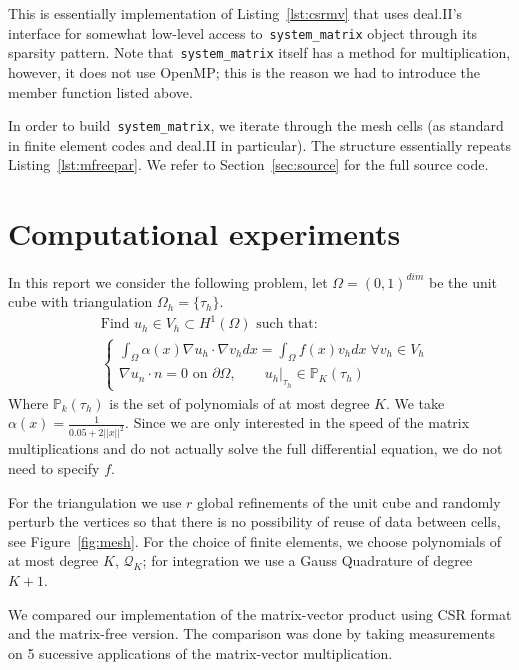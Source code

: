 \documentclass[12pt]{article}
\begin{document}
This is essentially implementation of Listing~\ref{lst:csrmv} that uses deal.II's interface for somewhat low-level access to~\texttt{system\_matrix} object through its sparsity pattern. Note that~\texttt{system\_matrix} itself has a method for multiplication, however, it does not use OpenMP; this is the reason we had to introduce the member function listed above.

In order to build~\texttt{system\_matrix}, we iterate through the mesh cells (as standard in finite element codes and deal.II in particular). The structure essentially repeats Listing~\ref{lst:mfreepar}. We refer to Section~\ref{sec:source} for the full source code. 

\section{Computational experiments}
In this report we consider the following problem, let $\Omega = (0, 1)^{dim}$ be the unit cube with triangulation $\Omega_h = \{\tau_{h}\}$.
\begin{align*}
&\text{Find } u_{h} \in V_h \subset H^{1}(\Omega) \text{ such that: }  \\
&\begin{cases}
\int_{\Omega} \alpha(x) \nabla u_{h} \cdot \nabla v_{h} dx  = \int_{\Omega} f(x) v_{h} dx \; \forall v_{h} \in V_h \\
\nabla u_{n} \cdot n = 0 \text{ on } \partial \Omega ,\qquad u_{h} \vert_{\tau_h} \in \mathbb{P}_{K}(\tau_h) 
\end{cases}
\end{align*}
Where $\mathbb{P}_{k}(\tau_h)$ is the set of polynomials of at most degree $K$. We take $\alpha(x) = \frac{1}{0.05 + 2\vert \vert x \vert \vert^{2}}$. Since we are only interested in the speed of the matrix multiplications and do not actually solve the full differential equation, we do not need to specify $f$.

For the triangulation we use $r$ global refinements of the unit cube and randomly perturb the vertices so that there is no possibility of reuse of data between cells, see Figure~\ref{fig:mesh}. For the choice of finite elements, we choose polynomials of at most degree $K$, $\mathcal{Q}_{K}$; for integration we use a Gauss Quadrature of degree $K+1$. 

We compared our implementation of the matrix-vector product using CSR format and the matrix-free version. The comparison was done by taking measurements on 5 sucessive applications of the matrix-vector multiplication.
\end{document}
